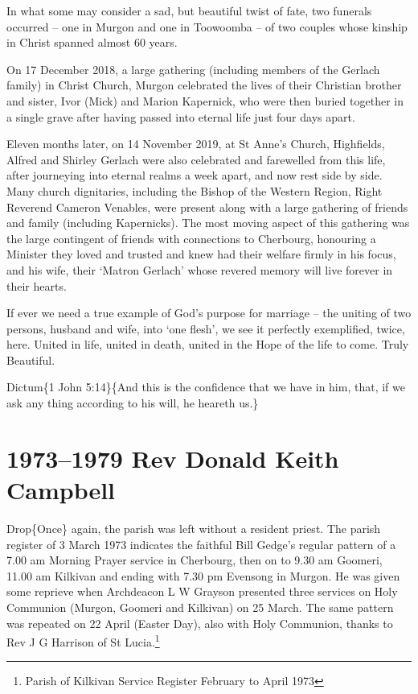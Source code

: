 In what some may consider a sad, but beautiful twist of fate, two funerals occurred -- one in Murgon and one in Toowoomba -- of two couples whose kinship in Christ spanned almost 60 years.

On 17 December 2018, a large gathering (including members of the Gerlach family) in Christ Church, Murgon celebrated the lives of their Christian brother and sister, Ivor (Mick) and Marion Kapernick, who were then buried together in a single grave after having passed into eternal life just four days apart.

Eleven months later, on 14 November 2019, at St Anne's Church, Highfields, Alfred and Shirley Gerlach were also celebrated and farewelled from this life, after journeying into eternal realms a week apart, and now rest side by side. Many church dignitaries, including the Bishop of the Western Region, Right Reverend Cameron Venables, were present along with a large gathering of friends and family (including Kapernicks). The most moving aspect of this gathering was the large contingent of friends with connections to Cherbourg, honouring a Minister they loved and trusted and knew had their welfare firmly in his focus, and his wife, their `Matron Gerlach' whose revered memory will live forever in their hearts.

If ever we need a true example of God's purpose for marriage -- the uniting of two persons, husband and wife, into `one flesh', we see it perfectly exemplified, twice, here. United in life, united in death, united in the Hope of the life to come. Truly Beautiful.

Dictum\{1 John 5:14\}\{And this is the confidence that we have in him, that, if we ask any thing according to his will, he heareth us.\}

\hypertarget{rev-donald-keith-campbell}{%
\chapter{1973--1979 Rev Donald Keith Campbell}\label{rev-donald-keith-campbell}}

Drop\{Once\} again, the parish was left without a resident priest. The parish register of 3 March 1973 indicates the faithful Bill Gedge's regular pattern of a 7.00 am Morning Prayer service in Cherbourg, then on to 9.30 am Goomeri, 11.00 am Kilkivan and ending with 7.30 pm Evensong in Murgon. He was given some reprieve when Archdeacon L W Grayson presented three services on Holy Communion (Murgon, Goomeri and Kilkivan) on 25 March. The same pattern was repeated on 22 April (Easter Day), also with Holy Communion, thanks to Rev J G Harrison of St Lucia.\footnote{Parish of Kilkivan Service Register February to April 1973}


